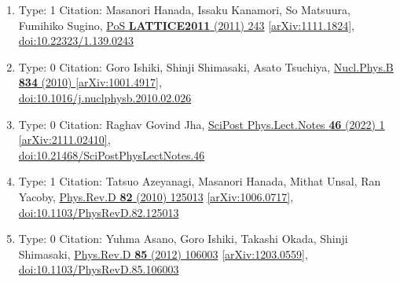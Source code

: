 \documentclass[a4paper,10pt]{article}
\begin{document}
\begin{enumerate}
\begin{enumerate}
  \item Type: 1 Citation: Masanori Hanada, Issaku Kanamori, So Matsuura, Fumihiko Sugino, \href{https://www.doi.org/10.22323/1.139.0243}{PoS {\bf LATTICE2011} (2011) 243}  \href{https://arxiv.org/abs/1111.1824}{[arXiv:1111.1824]},\\\href{https://www.doi.org/10.22323/1.139.0243}{doi:10.22323/1.139.0243}
  \item Type: 0 Citation: Goro Ishiki, Shinji Shimasaki, Asato Tsuchiya, \href{https://www.doi.org/10.1016/j.nuclphysb.2010.02.026}{Nucl.Phys.B {\bf 834} (2010) }  \href{https://arxiv.org/abs/1001.4917}{[arXiv:1001.4917]},\\\href{https://www.doi.org/10.1016/j.nuclphysb.2010.02.026}{doi:10.1016/j.nuclphysb.2010.02.026}
  \item Type: 0 Citation: Raghav Govind Jha, \href{https://www.doi.org/10.21468/SciPostPhysLectNotes.46}{SciPost Phys.Lect.Notes {\bf 46} (2022) 1}  \href{https://arxiv.org/abs/2111.02410}{[arXiv:2111.02410]},\\\href{https://www.doi.org/10.21468/SciPostPhysLectNotes.46}{doi:10.21468/SciPostPhysLectNotes.46}
  \item Type: 1 Citation: Tatsuo Azeyanagi, Masanori Hanada, Mithat Unsal, Ran Yacoby, \href{https://www.doi.org/10.1103/PhysRevD.82.125013}{Phys.Rev.D {\bf 82} (2010) 125013}  \href{https://arxiv.org/abs/1006.0717}{[arXiv:1006.0717]},\\\href{https://www.doi.org/10.1103/PhysRevD.82.125013}{doi:10.1103/PhysRevD.82.125013}
  \item Type: 0 Citation: Yuhma Asano, Goro Ishiki, Takashi Okada, Shinji Shimasaki, \href{https://www.doi.org/10.1103/PhysRevD.85.106003}{Phys.Rev.D {\bf 85} (2012) 106003}  \href{https://arxiv.org/abs/1203.0559}{[arXiv:1203.0559]},\\\href{https://www.doi.org/10.1103/PhysRevD.85.106003}{doi:10.1103/PhysRevD.85.106003}

\end{enumerate}
\end{enumerate}
\end{document}
